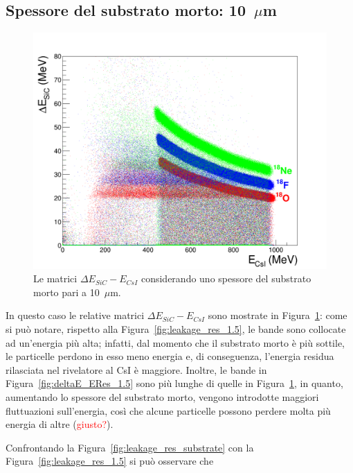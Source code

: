 \subsection*{Spessore del substrato morto: 10~$\mu$m}




\begin{figure} [!t]
	\centering
	\includegraphics[width=\textwidth, keepaspectratio]{Grafici_Tesi/Substrato/deltaE_ERes.png}
	\caption{Le matrici $\Delta E_{SiC} - E_{CsI}$ considerando uno spessore del substrato morto pari a 10~$\mu$m.} \label{fig:deltaE_ERes_substrate}
\end{figure}



In questo caso le relative matrici $\Delta E_{SiC} - E_{CsI}$ sono mostrate in Figura~\ref{fig:deltaE_ERes_substrate}: come si può notare, rispetto alla Figura~\ref{fig:leakage_res_1.5}, le bande sono collocate ad un'energia più alta; infatti, dal momento che il substrato morto è più sottile, le particelle perdono in esso meno energia e, di conseguenza, l'energia residua rilasciata nel rivelatore al CsI è maggiore.
Inoltre, le bande in Figura~\ref{fig:deltaE_ERes_1.5} sono più lunghe di quelle in Figura~\ref{fig:deltaE_ERes_substrate}, in quanto, aumentando lo spessore del substrato morto, vengono introdotte maggiori fluttuazioni sull'energia, così che alcune particelle possono perdere molta più energia di altre (\textcolor{red}{giusto?}).

Confrontando la Figura~\ref{fig:leakage_res_substrate} con la Figura~\ref{fig:leakage_res_1.5} si può osservare che


















